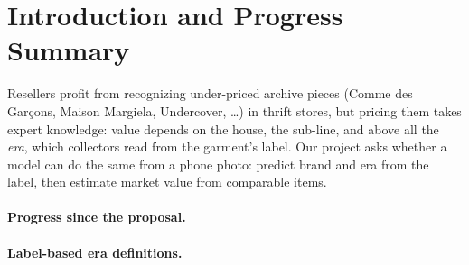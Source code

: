 \section{Introduction and Progress Summary}
\label{sec:intro}
Resellers profit from recognizing under-priced archive pieces (Comme des Gar\c{c}ons, Maison
Margiela, Undercover, \dots) in thrift stores, but pricing them takes expert knowledge: value
depends on the house, the sub-line, and above all the \emph{era}, which collectors read from the
garment's label. Our project asks whether a model can do the same from a phone photo: predict brand
and era from the label, then estimate market value from comparable items.

\paragraph{Progress since the proposal.}


\paragraph{Label-based era definitions.}
\label{sec:eras}

